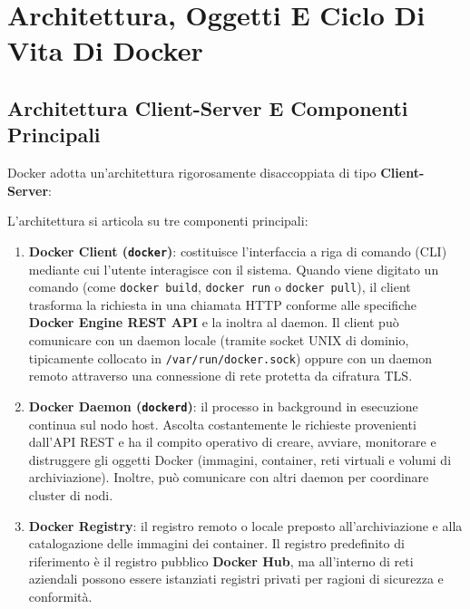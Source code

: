 \documentclass[11pt, a4paper]{article}
\begin{document}
\newpage


\section{Architettura, Oggetti E Ciclo Di Vita Di Docker}

\subsection{Architettura Client-Server E Componenti Principali}

Docker adotta un'architettura rigorosamente disaccoppiata di tipo \textbf{Client-Server}:


L'architettura si articola su tre componenti principali:
\begin{enumerate}
    \item \textbf{Docker Client (\texttt{docker})}: costituisce l'interfaccia a riga di comando (CLI) mediante cui l'utente interagisce con il sistema. Quando viene digitato un comando (come \texttt{docker build}, \texttt{docker run} o \texttt{docker pull}), il client trasforma la richiesta in una chiamata HTTP conforme alle specifiche \textbf{Docker Engine REST API} e la inoltra al daemon. Il client può comunicare con un daemon locale (tramite socket UNIX di dominio, tipicamente collocato in \texttt{/var/run/docker.sock}) oppure con un daemon remoto attraverso una connessione di rete protetta da cifratura TLS.
    \item \textbf{Docker Daemon (\texttt{dockerd})}: il processo in background in esecuzione continua sul nodo host. Ascolta costantemente le richieste provenienti dall'API REST e ha il compito operativo di creare, avviare, monitorare e distruggere gli oggetti Docker (immagini, container, reti virtuali e volumi di archiviazione). Inoltre, può comunicare con altri daemon per coordinare cluster di nodi.
    \item \textbf{Docker Registry}: il registro remoto o locale preposto all'archiviazione e alla catalogazione delle immagini dei container. Il registro predefinito di riferimento è il registro pubblico \textbf{Docker Hub}, ma all'interno di reti aziendali possono essere istanziati registri privati per ragioni di sicurezza e conformità.
\end{enumerate}
\end{document}
